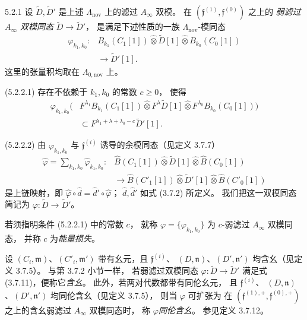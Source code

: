 \begin{definition}{5.2.1}\label{def:5-2-1}
设 $\widetilde D,\widetilde D'$ 是上述
$\Lambda_{\mathrm{nov}}$ 上的滤过 $A_\infty$ 双模。
在 $(\mathfrak f^{(1)},\mathfrak f^{(0)})$ 之上的
\emph{弱滤过 $A_\infty$ 双模同态}
$\widetilde D\to\widetilde D'$，
是满足下述性质的一族
$\Lambda_{\mathrm{nov}}$-模同态
\[
\begin{aligned}
\varphi_{k_1,k_0}:{}
&B_{k_1}(C_1[1])
 \widehat\otimes\widetilde D[1]
 \widehat\otimes B_{k_0}(C_0[1])\\
&\longrightarrow\widetilde D'[1].
\end{aligned}
\]
这里的张量积均取在
$\Lambda_{0,\mathrm{nov}}$ 上。

\par\noindent\textup{(5.2.2.1)}\quad
存在不依赖于 $k_1,k_0$ 的常数 $c\geq0$，
使得
\[
\begin{aligned}
\varphi_{k_1,k_0}\bigl(&
F^{\lambda_1}B_{k_1}(C_1[1])
\widehat\otimes F^\lambda\widetilde D[1]
\widehat\otimes F^{\lambda_0}B_{k_0}(C_0[1])
\bigr)\\
&\subset F^{\lambda_1+\lambda+\lambda_0-c}
\widetilde D'[1].
\end{aligned}
\]

\par\noindent\textup{(5.2.2.2)}\quad
由 $\varphi_{k_1,k_0}$ 与 $\mathfrak f^{(i)}$
诱导的余模同态（见定义 3.7.7）
\[
\begin{aligned}
\widehat\varphi
=\sum_{k_1,k_0}\widehat\varphi_{k_1,k_0}:{}
&\widehat B(C_1[1])
 \widehat\otimes\widetilde D[1]
 \widehat\otimes\widehat B(C_0[1])\\
&\longrightarrow
\widehat B(C'_1[1])
 \widehat\otimes\widetilde D'[1]
 \widehat\otimes\widehat B(C'_0[1])
\end{aligned}
\]
是上链映射，即
$\widehat\varphi\circ\widehat d
=\widehat d'\circ\widehat\varphi$；
$\widehat d,\widehat d'$ 如式 (3.7.2) 所定义。
我们把这一双模同态简记为
$\varphi:\widetilde D\to\widetilde D'$。
\end{definition}

若须指明条件 (5.2.2.1) 中的常数 $c$，
就称 $\varphi=\{\varphi_{k_1,k_0}\}$
为 $c$-弱滤过 $A_\infty$ 双模同态，
并称 $c$ 为\emph{能量损失}。

设 $(C_i,\mathfrak m)$、$(C'_i,\mathfrak m')$
带有幺元，且 $\mathfrak f^{(i)}$、
$(D,\mathfrak n)$、$(D',\mathfrak n')$
均含幺（见定义 3.7.5）。
与第 3.7.2 小节一样，
若弱滤过双模同态
$\varphi:\widetilde D\to\widetilde D'$
满足式 (3.7.11)，便称它\emph{含幺}。
此外，若两对代数都带有同伦幺元，
且 $\mathfrak f^{(i)}$、
$(D,\mathfrak n)$、$(D',\mathfrak n')$
均同伦含幺（见定义 3.7.5），
则当 $\varphi$ 可扩张为
在 $(\mathfrak f^{(1),+},\mathfrak f^{(0),+})$
之上的含幺弱滤过 $A_\infty$ 双模同态时，
称 $\varphi$\emph{同伦含幺}。
参见定义 3.7.12。

